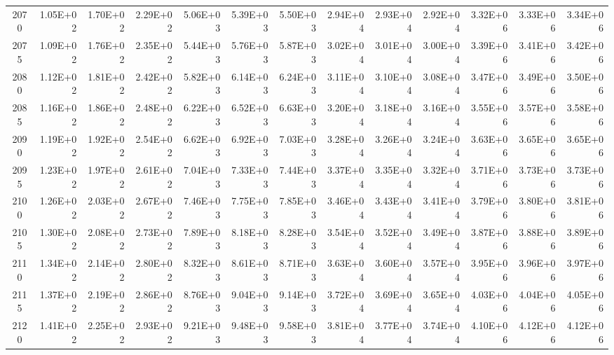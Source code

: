 \documentclass{article}
\begin{document}
\begin{table}
\begin{tabular}{crrr|rrr|rrr|rrr}
2070     & 1.05E+02 & 1.70E+02 & 2.29E+02 & 5.06E+03 & 5.39E+03 & 5.50E+03 & 2.94E+04 & 2.93E+04 & 2.92E+04 & 3.32E+06 & 3.33E+06 & 3.34E+06 \\
2075     & 1.09E+02 & 1.76E+02 & 2.35E+02 & 5.44E+03 & 5.76E+03 & 5.87E+03 & 3.02E+04 & 3.01E+04 & 3.00E+04 & 3.39E+06 & 3.41E+06 & 3.42E+06 \\
2080     & 1.12E+02 & 1.81E+02 & 2.42E+02 & 5.82E+03 & 6.14E+03 & 6.24E+03 & 3.11E+04 & 3.10E+04 & 3.08E+04 & 3.47E+06 & 3.49E+06 & 3.50E+06 \\
2085     & 1.16E+02 & 1.86E+02 & 2.48E+02 & 6.22E+03 & 6.52E+03 & 6.63E+03 & 3.20E+04 & 3.18E+04 & 3.16E+04 & 3.55E+06 & 3.57E+06 & 3.58E+06 \\
2090     & 1.19E+02 & 1.92E+02 & 2.54E+02 & 6.62E+03 & 6.92E+03 & 7.03E+03 & 3.28E+04 & 3.26E+04 & 3.24E+04 & 3.63E+06 & 3.65E+06 & 3.65E+06 \\
2095     & 1.23E+02 & 1.97E+02 & 2.61E+02 & 7.04E+03 & 7.33E+03 & 7.44E+03 & 3.37E+04 & 3.35E+04 & 3.32E+04 & 3.71E+06 & 3.73E+06 & 3.73E+06 \\
2100     & 1.26E+02 & 2.03E+02 & 2.67E+02 & 7.46E+03 & 7.75E+03 & 7.85E+03 & 3.46E+04 & 3.43E+04 & 3.41E+04 & 3.79E+06 & 3.80E+06 & 3.81E+06 \\
2105     & 1.30E+02 & 2.08E+02 & 2.73E+02 & 7.89E+03 & 8.18E+03 & 8.28E+03 & 3.54E+04 & 3.52E+04 & 3.49E+04 & 3.87E+06 & 3.88E+06 & 3.89E+06 \\
2110     & 1.34E+02 & 2.14E+02 & 2.80E+02 & 8.32E+03 & 8.61E+03 & 8.71E+03 & 3.63E+04 & 3.60E+04 & 3.57E+04 & 3.95E+06 & 3.96E+06 & 3.97E+06 \\
2115     & 1.37E+02 & 2.19E+02 & 2.86E+02 & 8.76E+03 & 9.04E+03 & 9.14E+03 & 3.72E+04 & 3.69E+04 & 3.65E+04 & 4.03E+06 & 4.04E+06 & 4.05E+06 \\
2120     & 1.41E+02 & 2.25E+02 & 2.93E+02 & 9.21E+03 & 9.48E+03 & 9.58E+03 & 3.81E+04 & 3.77E+04 & 3.74E+04 & 4.10E+06 & 4.12E+06 & 4.12E+06
\end{tabular}
\end{table}
\end{document}
